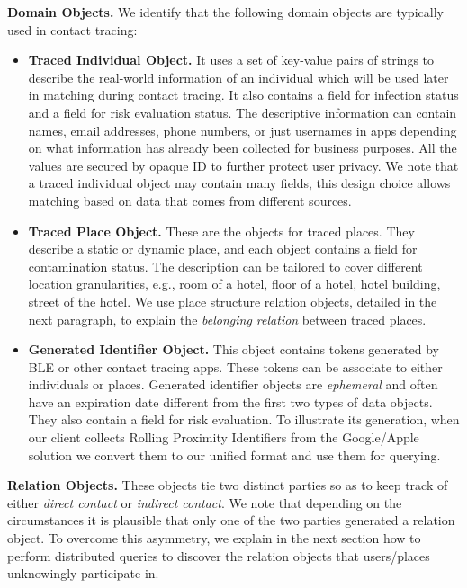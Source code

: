 \documentclass[11pt]{article}  %
\begin{document}
\textbf{Domain Objects.} We identify that the following domain objects are typically used in contact tracing:
        \begin{itemize}
            \item \textbf{Traced Individual Object.} It uses a set of key-value pairs of strings to describe the real-world information of an individual which will be used later in matching during contact tracing. It also contains a field for infection status and a field for risk evaluation status. The descriptive information can contain names, email addresses, phone numbers, or just usernames in apps depending on what information has already been collected for business purposes. All the values are secured by opaque ID to further protect user privacy. We note that a traced individual object may contain many fields, this design choice allows matching based on data that comes from different sources. 
            
            \item \textbf{Traced Place Object. }These are the objects for traced places. 
            They describe a static or dynamic place, and each object contains a field for contamination status. 
            The description can be tailored to cover different location granularities, e.g., room of a hotel, floor of a hotel, hotel building, street of the hotel. We use place structure relation objects, detailed in the next paragraph, to explain the \emph{belonging relation} between traced places.
            
        
            \item \textbf{Generated Identifier Object. }This object contains tokens generated by BLE or other contact tracing apps. These tokens can be associate to either individuals or places. Generated identifier objects are \emph{ephemeral} and often have an expiration date different from the first two types of data  objects. They also contain a field for risk evaluation. To illustrate its generation, when our client collects Rolling Proximity Identifiers from the Google/Apple solution we convert them to our unified format and use them for querying. 

        
        \end{itemize}
 \textbf{Relation Objects. }These objects tie two distinct parties so as to keep track of either \emph{direct contact} or \emph{indirect contact}. We note that depending on the circumstances it is plausible that only one of the two parties generated a relation object. To overcome this asymmetry, we explain in the next section how to perform distributed queries to discover the relation objects that users/places unknowingly participate in. 
\end{document}
